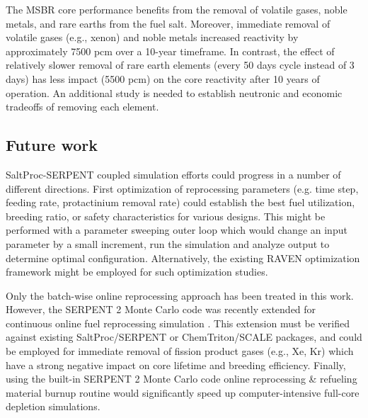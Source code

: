The \gls{MSBR} core performance benefits from the removal of volatile gases, 
noble metals, and rare earths from the fuel salt. 
Moreover, immediate removal of volatile gases (e.g., xenon) and noble metals 
increased reactivity by approximately 7500 pcm over a 10-year 
timeframe. In contrast, the effect of relatively slower removal of rare earth 
elements (every 50 days cycle instead of 3 days) has less impact (5500 pcm) on 
the core reactivity after 10 years of operation. An additional study 
is needed to establish neutronic  and economic tradeoffs of removing each element.

\subsection{Future work}
SaltProc-SERPENT coupled simulation efforts could progress in a 
number of different directions. First optimization of reprocessing parameters (e.g. time step, feeding rate, 
protactinium removal rate) could establish the best fuel utilization, breeding 
ratio, or safety characteristics for various designs. This might be performed with a parameter sweeping 
outer loop which would change an input parameter by a small increment, run the 
simulation and analyze output to determine optimal configuration. Alternatively, 
the existing RAVEN optimization framework \cite{alfonsi_raven_2013} might be 
employed for such optimization studies.

Only the batch-wise online reprocessing approach has been treated in this 
work. However, the SERPENT 2 Monte Carlo code was recently extended for 
continuous online fuel reprocessing simulation \cite{aufiero_extended_2013}. 
This extension must be verified against existing SaltProc/SERPENT or 
ChemTriton/SCALE packages, and could be employed for immediate removal of 
fission product gases (e.g., Xe, Kr) which have a strong negative impact on 
core lifetime and breeding efficiency. Finally, using the built-in SERPENT 2 
Monte Carlo code online reprocessing \& refueling material burnup routine would 
significantly speed up computer-intensive full-core depletion simulations.
